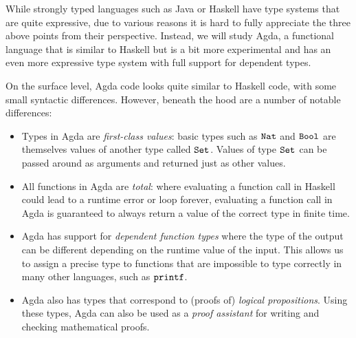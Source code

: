 \documentclass[a4paper,UKenglish]{tufte-handout}
\theoremstyle{definition}
\newcommand\prim[1]{{\AgdaPrimitive{#1}}}
\newcommand\ty[1]{{{\prim{Set}}_{#1}}}
\newcommand\fun[1]{{\AgdaFunction{#1}}}
\newcommand\data[1]{{\AgdaFunction{#1}}}
\newcommand\Nat{\data{Nat}}
\newcommand\Bool{\data{Bool}}
\begin{document}
While strongly typed languages such as Java or Haskell have type
systems that are quite expressive, due to various reasons it is hard
to fully appreciate the three above points from their
perspective. Instead, we will study Agda, a functional language that
is similar to Haskell but is a bit more experimental and has an even
more expressive type system with full support for dependent types.

On the surface level, Agda code looks quite similar to Haskell code,
with some small syntactic differences. However, beneath the hood are a
number of notable differences:
\begin{itemize}

\item Types in Agda are \emph{first-class values}: basic types such as
  $\Nat$ and $\Bool$ are themselves values of another type called
  $\ty{}$. Values of type $\ty{}$ can be passed around as arguments
  and returned just as other values.

\item All functions in Agda are \emph{total}: where evaluating a
  function call in Haskell could lead to a runtime error or loop
  forever, evaluating a function call in Agda is guaranteed to always
  return a value of the correct type in finite time.

\item Agda has support for \emph{dependent function types} where the
  type of the output can be different depending on the runtime value
  of the input. This allows us to assign a precise type to functions
  that are impossible to type correctly in many other languages, such
  as $\fun{printf}$.

\item Agda also has types that correspond to (proofs of) \emph{logical
  propositions}. Using these types, Agda can also be used as a
  \emph{proof assistant} for writing and checking mathematical proofs.

\end{itemize}
\end{document}
